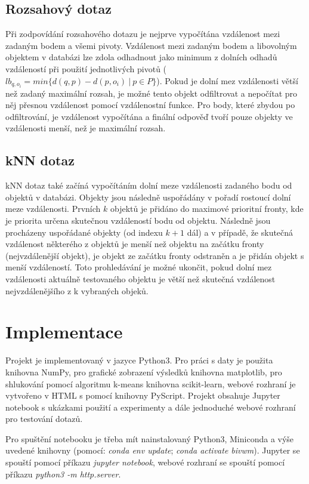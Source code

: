 \documentclass{article}
\begin{document}
\subsection{Rozsahový dotaz}

Při zodpovídání rozsahového dotazu je nejprve vypočítána vzdálenost mezi zadaným bodem a všemi pivoty. Vzdálenost mezi zadaným bodem a libovolným objektem v databázi lze zdola odhadnout jako minimum z dolních odhadů vzdáleností při použití jednotlivých pivotů ($lb_{q,o_i} = min \{ d(q, p) - d(p, o_i)\ |\ p \in P \}$). Pokud je dolní mez vzdálenosti větší než zadaný maximální rozsah, je možné tento objekt odfiltrovat a nepočítat pro něj přesnou vzdálenost pomocí vzdálenostní funkce. Pro body, které zbydou po odfiltrování, je vzdálenost vypočítána a finální odpověď tvoří pouze objekty ve vzdálenosti menší, než je maximální rozsah.

\subsection{kNN dotaz}

kNN dotaz také začíná vypočítáním dolní meze vzdálenosti zadaného bodu od objektů v databázi. Objekty jsou následně uspořádány v pořadí rostoucí dolní meze vzdálenosti. Prvních $k$ objektů je přidáno do maximové prioritní fronty, kde je priorita určena skutečnou vzdáleností bodu od objektu. Následně jsou procházeny uspořádané objekty (od indexu $k+1$ dál) a v případě, že skutečná vzdálenost některého z objektů je menší než objektu na začátku fronty (nejvzdálenější objekt), je objekt ze začátku fronty odstraněn a je přidán objekt s menší vzdáleností. Toto prohledávání je možné ukončit, pokud dolní mez vzdálenosti aktuálně testovaného objektu je větší než skutečná vzdálenost nejvzdálenějšího z k vybraných objeků.

\section{Implementace}

Projekt je implementovaný v jazyce Python3. Pro práci s daty je použita knihovna NumPy, pro grafické zobrazení výsledků knihovna matplotlib, pro shlukování pomocí algoritmu k-means knihovna scikit-learn, webové rozhraní je vytvořeno v HTML s pomocí knihovny PyScript. Projekt obsahuje Jupyter notebook s ukázkami použití a experimenty a dále jednoduché webové rozhraní pro testování dotazů. 

Pro spuštění notebooku je třeba mít nainstalovaný Python3, Miniconda a výše uvedené knihovny (pomocí: \textit{conda env update}; \textit{conda activate bivwm}). Jupyter se spouští pomocí příkazu \textit{jupyter notebook}, webové rozhraní se spouští pomocí příkazu \textit{python3 -m http.server}.
\end{document}
